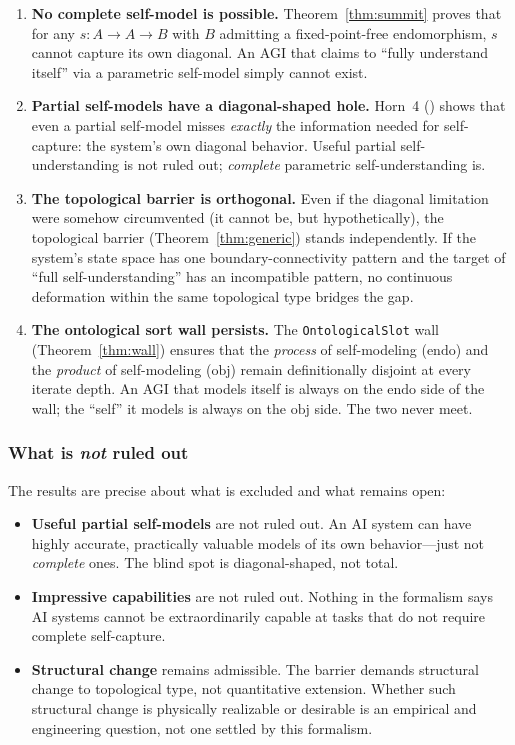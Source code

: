 \documentclass[11pt]{article}
\begin{document}
\begin{enumerate}[label=(\alph*),itemsep=0.3ex]
\item \textbf{No complete self-model is possible.}
  Theorem~\ref{thm:summit} proves that for any $s : A \to A \to B$
  with $B$ admitting a fixed-point-free endomorphism, $s$ cannot
  capture its own diagonal.  An AGI that claims to ``fully understand
  itself'' via a parametric self-model simply cannot exist.
\item \textbf{Partial self-models have a diagonal-shaped hole.}
  Horn~4 () shows that even
  a partial self-model misses \emph{exactly} the information needed
  for self-capture: the system's own diagonal behavior.  Useful
  partial self-understanding is not ruled out; \emph{complete}
  parametric self-understanding is.
\item \textbf{The topological barrier is orthogonal.}
  Even if the diagonal limitation were somehow circumvented (it
  cannot be, but hypothetically), the topological barrier
  (Theorem~\ref{thm:generic}) stands independently.  If the
  system's state space has one boundary-connectivity pattern and the
  target of ``full self-understanding'' has an incompatible pattern,
  no continuous deformation within the same topological type bridges
  the gap.
\item \textbf{The ontological sort wall persists.}
  The \texttt{OntologicalSlot} wall (Theorem~\ref{thm:wall}) ensures
  that the \emph{process} of self-modeling ($\mathrm{endo}$) and the
  \emph{product} of self-modeling ($\mathrm{obj}$) remain
  definitionally disjoint at every iterate depth.  An AGI that models
  itself is always on the $\mathrm{endo}$ side of the wall; the
  ``self'' it models is always on the $\mathrm{obj}$ side.  The two
  never meet.
\end{enumerate}

\subsubsection{What is \emph{not} ruled out}

The results are precise about what is excluded and what remains open:

\begin{itemize}[leftmargin=1.5em,itemsep=0.2ex,topsep=0.4ex,parsep=0pt]
\item \textbf{Useful partial self-models} are not ruled out.  An AI
  system can have highly accurate, practically valuable models of its
  own behavior---just not \emph{complete} ones.  The blind spot is
  diagonal-shaped, not total.
\item \textbf{Impressive capabilities} are not ruled out.  Nothing
  in the formalism says AI systems cannot be extraordinarily capable
  at tasks that do not require complete self-capture.
\item \textbf{Structural change} remains admissible.  The barrier
  demands structural change to topological type, not quantitative
  extension.  Whether such structural change is physically realizable
  or desirable is an empirical and engineering question, not one
  settled by this formalism.
\end{itemize}
\end{document}
